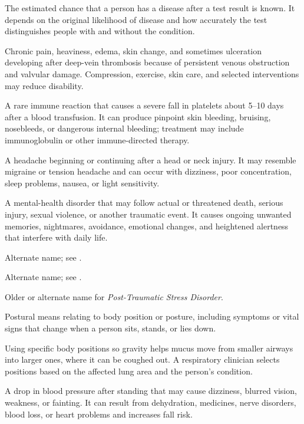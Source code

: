  The estimated chance that a person has a disease after a test result is known. It depends on the original likelihood of disease and how accurately the test distinguishes people with and without the condition.

 Chronic pain, heaviness, edema, skin change, and sometimes ulceration developing after
deep-vein thrombosis because of persistent venous obstruction and valvular damage.
Compression, exercise, skin care, and selected interventions may reduce disability.

 A rare immune reaction that causes a severe fall in platelets about 5–10 days after a blood transfusion. It can produce pinpoint skin bleeding, bruising, nosebleeds, or dangerous internal bleeding; treatment may include immunoglobulin or other immune-directed therapy.

 A headache beginning or continuing after a head or neck injury. It may resemble migraine or tension headache and can occur with dizziness, poor concentration, sleep problems, nausea, or light sensitivity.

 A mental-health disorder that may follow actual or threatened death, serious injury, sexual violence, or another traumatic event. It causes ongoing unwanted memories, nightmares, avoidance, emotional changes, and heightened alertness that interfere with daily life.

 Alternate name; see .

 Alternate name; see .

 Older or alternate name for \textit{Post-Traumatic Stress Disorder}.

 Postural means relating to body position or posture, including symptoms or vital signs that change when a person sits, stands, or lies down.

 Using specific body positions so gravity helps mucus move from smaller airways into larger ones, where it can be coughed out. A respiratory clinician selects positions based on the affected lung area and the person’s condition.

 A drop in blood pressure after standing that may cause dizziness, blurred vision, weakness, or fainting. It can result from dehydration, medicines, nerve disorders, blood loss, or heart problems and increases fall risk.

